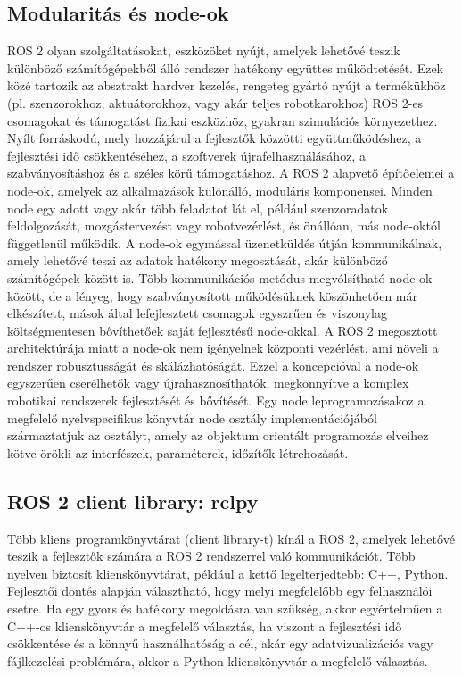 \subsection{Modularitás és node-ok}
ROS 2 olyan szolgáltatásokat, eszközöket nyújt, amelyek lehetővé teszik különböző számítógépekből álló rendszer hatékony együttes működtetését. Ezek közé tartozik az absztrakt hardver kezelés, rengeteg gyártó nyújt a termékükhöz (pl. szenzorokhoz, aktuátorokhoz, vagy akár teljes robotkarokhoz) ROS 2-es csomagokat és támogatást fizikai eszközhöz, gyakran szimulációs környezethez. Nyílt forráskodú, mely hozzájárul a fejlesztők közzötti együttműködéshez, a fejlesztési idő csökkentéséhez, a szoftverek újrafelhasználásához, a szabványosításhoz és a széles körű támogatáshoz. A ROS 2 alapvető építőelemei a node-ok, amelyek az alkalmazások különálló, moduláris komponensei. Minden node egy adott vagy akár több feladatot lát el, például szenzoradatok feldolgozását, mozgástervezést vagy robotvezérlést, és önállóan, más node-októl függetlenül működik. A node-ok egymással üzenetküldés útján kommunikálnak, amely lehetővé teszi az adatok hatékony megosztását, akár különböző számítógépek között is. Több kommunikációs metódus megvólsítható node-ok között, de a lényeg, hogy szabványosított működésüknek köszönhetően már elkészített, mások által lefejlesztett csomagok egyszrűen és viszonylag költségmentesen bővíthetőek saját fejlesztésű node-okkal. A ROS 2 megosztott architektúrája miatt a node-ok nem igényelnek központi vezérlést, ami növeli a rendszer robusztusságát és skálázhatóságát. Ezzel a koncepcióval a node-ok egyszerűen cserélhetők vagy újrahasznosíthatók, megkönnyítve a komplex robotikai rendszerek fejlesztését és bővítését. Egy node leprogramozásakoz a megfelelő nyelvspecifikus könyvtár node osztály implementációjából származtatjuk az osztályt, amely az objektum orientált programozás elveihez kötve örökli az interfészek, paraméterek, időzítők létrehozását. \cite{ros2}

\subsection{ROS 2 client library: rclpy}
Több kliens programkönyvtárat (client library-t) kínál a ROS 2, amelyek lehetővé teszik a fejlesztők számára a ROS 2 rendszerrel való kommunikációt. Több nyelven biztosít klienskönyvtárat, például a kettő legelterjedtebb: C++, Python. Fejlesztői döntés alapján választható, hogy melyi megfelelőbb egy felhasználói esetre. Ha egy gyors és hatékony megoldásra van szükség, akkor egyértelműen a C++-os klienskönyvtár a megfelelő választás, ha viszont a fejlesztési idő csökkentése és a könnyű használhatóság a cél, akár egy adatvizualizációs vagy fájlkezelési problémára, akkor a Python klienskönyvtár a megfelelő választás.

